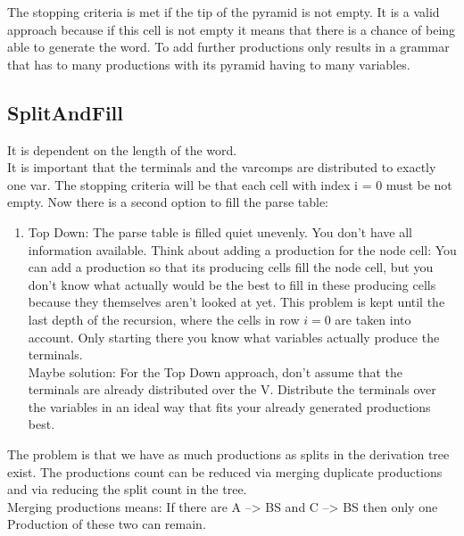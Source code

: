 \noindent The stopping criteria is met if the tip of the pyramid is not empty. It is a valid approach because if this cell is not empty it means that there is a chance of being able to generate the word. To add further productions only results in a grammar that has to many productions with its pyramid having to many variables.
\pagebreak

\subsection{SplitAndFill}

It is dependent on the length of the word.\\
It is important that the terminals and the varcomps are distributed to exactly one var.
The stopping criteria will be that each cell with index i = 0 must be not empty.
Now there is a second option to fill the parse table:
\begin{enumerate}
	\item Top Down: The parse table is filled quiet unevenly. You don't have all information available. Think about adding a production for the node cell: You can add a production so that its producing cells fill the node cell, but you don't know what actually would be the best to fill in these producing cells because they themselves aren't looked at yet. This problem is kept until the last depth of the recursion, where the cells in row $i=0$ are taken into account. Only starting there you know what variables actually produce the terminals.\\
	Maybe solution: For the Top Down approach, don't assume that the terminals are already distributed over the V. Distribute the terminals over the variables in an ideal way that fits your already generated productions best.
\end{enumerate}
The problem is that we have as much productions as splits in the derivation tree exist. The productions count can be reduced via merging duplicate productions and via reducing the split count in the tree. \\
Merging productions means: If there are A --> BS and C --> BS then only one Production of these two can remain.\\

\pagebreak
\noindent
{}

